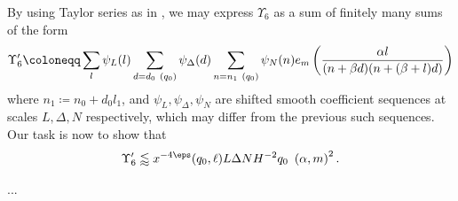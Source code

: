 By using Taylor series as in \cite[\S 10]{polymath8a}, we may express $\Upsilon_6$ as a sum of finitely many sums of the form
$$  \Upsilon'_6 \coloneqq \sum_l \psi_L(l) \sum_{d=d_0\ (q_0)} \psi_{\Delta}(d)
  \sum_{n=n_1\ (q_0)} \psi_N(n)\\
  e_m\left(\frac{\alpha l}{(n+\beta d)(n+(\beta+l)d)}
  \right)
$$
where $n_1 \coloneqq n_0 + d_0 l_1$, and $\psi_L, \psi_\Delta, \psi_N$ are shifted smooth coefficient sequences at scales $L, \Delta, N$ respectively, which may differ from the previous such sequences.  Our task is now to show that
$$
\Upsilon'_6 \lessapprox 
x^{-4\eps} (q_0,\ell) L \Delta
N H^{-2}q_0 \ \left(\alpha,m\right)^2.$$



...


